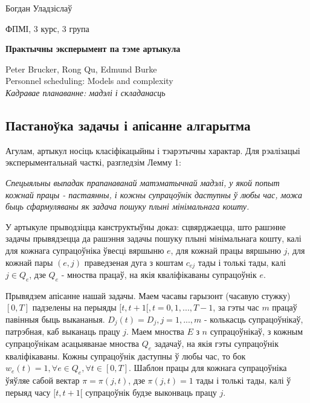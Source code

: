 \documentclass{article}
\begin{document}
{\large

Богдан Уладзіслаў

ФПМІ, 3 курс, 3 група

\vspace{5mm}

\textbf{Практычны эксперымент па тэме артыкула}

\vspace{5mm}

Peter Brucker, Rong Qu, Edmund Burke \\
Personnel scheduling: Models and complexity \\
\textit{Кадравае планаванне: мадэлі і складанасць}
}

\vspace{5mm}

\subsection*{Пастаноўка задачы і апісанне алгарытма}

Агулам, артыкул носіць класіфікацыйны і тэарэтычны характар. Для рэалізацыі эксперыментальнай
часткі, разгледзім Лемму 1:

\textit{Спецыяльны выпадак прапанаванай матэматычнай мадэлі, у якой попыт кожнай працы - пастаянны,
і кожны супрацоўнік даступны ў любы час, можа быць сфармуляваны як задача пошуку плыні мінімальнага кошту.}

У артыкуле прыводзіцца канструктыўны доказ: сцвярджаецца, што рашэнне задачы прывядзецца да
рашэння задачы пошуку плыні мінімальнага кошту, калі для кожнага супрацоўніка ўвесці вяршыню $e$, для кожнай
працы вяршыню $j$, для кожнай пары $(e, j)$ праведзеная дуга з коштам $c_{ej}$ тады і толькі тады, калі $j \in Q_e$,
дзе $Q_e$ - мноства працаў, на якія кваліфікаваны супрацоўнік $e$.

Прывядзем апісанне нашай задачы. Маем часавы гарызонт (часавую стужку) $[0, T]$ падзелены на перыяды $[t, t+1[,
t = 0, 1, ..., T-1$, за гэты час $m$ працаў павінныя быць выкананыя. $D_j(t) = D_j, j=1,...,m$ - колькасць супрацоўнікаў,
патрэбная, каб выканаць працу $j$. Маем мноства $E$ з $n$ супрацоўнікаў, з кожным супрацоўнікам асацыяванае мноства
$Q_e$ задачаў, на якія гэты супрацоўнік кваліфікаваны. Кожны супрацоўнік даступны ў любы час, то бок
$w_e(t) = 1, \forall e \in Q_e, \forall t \in [0, T]$. Шаблон працы для кожнага супрацоўніка ўяўляе сабой
вектар $\pi = \pi(j,t)$, дзе $\pi(j,t) = 1$ тады і толькі тады, калі ў перыяд часу $[t, t+1[$ супрацоўнік будзе
выконваць працу $j$.
\end{document}
